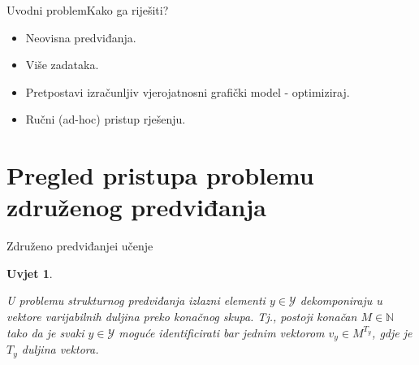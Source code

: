\documentclass{beamer}
\newtheorem{condition}{Uvjet}
\newcommand*{\field}[1]{\mathbb{#1}}
\begin{document}
\begin{frame}{Uvodni problem}{Kako ga riješiti?}
  \begin{figure}
  \centering
  \end{figure}
  \begin{itemize}
    \item<1-> Neovisna predviđanja.
    \item<2-> Više zadataka.
    \item<3-> Pretpostavi izračunljiv vjerojatnosni grafički model - optimiziraj.
    \item<4-> Ručni (ad-hoc) pristup rješenju.
  \end{itemize}
\end{frame}

\section{Pregled pristupa problemu združenog predviđanja}

\begin{frame}{Združeno predviđanje}{i učenje}
  \begin{condition}\label{uvjet1}

    U problemu strukturnog predviđanja izlazni elementi $y \in \mathcal{Y}$
    dekomponiraju u vektore varijabilnih duljina preko konačnog skupa. Tj.,
    postoji konačan $M \in \field{N}$ tako da je svaki $y \in \mathcal{Y}$
    moguće identificirati bar jednim vektorom $v_y \in M^{T_y}$, gdje je $T_y$
    duljina vektora.

  \end{condition}
\end{frame}
\end{document}
